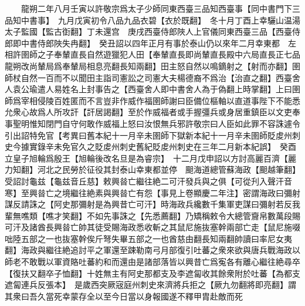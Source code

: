 　　龍朔二年八月壬寅以許敬宗爲太子少師同東西臺三品知西臺事【同中書門下三品知中書事】　九月戊寅初令八品九品衣碧【衣於既翻】　冬十月丁酉上幸驪山温湯太子監國【監古衘翻】丁未還宫　庚戌西臺侍郎陜人上官儀同東西臺三品【西臺侍郎即中書侍郎陜失冉翻】　癸丑詔以四年正月有事於泰山仍以來年二月幸東都　左相許圉師之子奉輦直長自然遊獵犯人田【奉輦直長即尚輦直長殿中六局直長正七品龍朔改尚輦局爲奉輦局相息亮翻長知兩翻】田主怒自然以鳴鏑射之【射而亦翻】圉師杖自然一百而不以聞田主詣司憲訟之司憲大夫楊德裔不爲治【治直之翻】西臺舍人袁公瑜遣人易姓名上封事告之【西臺舍人即中書舍人為于偽翻上時掌翻】上曰圉師爲宰相侵陵百姓匿而不言豈非作威作福圉師謝曰臣備位樞軸以直道事陛下不能悉允衆心故爲人所攻訐【訐居謁翻】至於作威福者或手握彊兵或身居重鎮臣以文吏奉事聖明惟知閉門自守何敢作威福上怒曰汝恨無兵邪許敬宗曰人臣如此罪不容誅遽令引出詔特免官【考異曰舊本紀十一月辛未圉師下獄新本紀十一月辛未圉師貶䖍州刺史今據實錄辛未免官久之貶䖍州刺史舊紀貶䖍州刺史在三年二月新本紀誤】　癸酉立皇子旭輪爲殷王【旭輪後改名旦是為睿宗】　十二月戊申詔以方討高麗百濟【麗力知翻】河北之民勞於征役其封泰山幸東都並停　䫻海道總管蘇海政【䫻越筆翻】受詔討龜兹【龜兹音丘慈】敕興㫺亡繼往絶二可汗發兵與之俱【可從刋入聲汗音寒】至興㫺亡之境繼往絶素與興㫺亡有怨【事見上卷顯慶二年注】密謂海政曰彌射謀反請誅之【阿史那彌射是為興昔亡可汗】時海政兵纔數千集軍吏謀曰彌射若反我輩無噍類【噍才笑翻】不如先事誅之【先悉薦翻】乃矯稱敕令大總管齎帛數萬段賜可汗及諸酋長興㫺亡帥其徒受賜海政悉收斬之其鼠尼施抜塞幹兩部亡走【鼠尼施啜咄陸五部之一也抜塞幹俟斤弩失畢五部之一也酋慈由翻長知兩翻帥讀曰率尼女夷翻】海政與繼往絶追討平之軍還至踈勒南弓月部復引吐蕃之衆來欲與唐兵戰海政以師老不敢戰以軍資賂吐蕃約和而還由是諸部落皆以興昔亡爲寃各有離心繼往絶尋卒【復扶又翻卒子恤翻】十姓無主有阿史那都支及李遮匐收其餘衆附於吐蕃【為都支遮匐連兵反張本】　是歲西突厥宼庭州刺史來濟將兵拒之【厥九勿翻將即亮翻】謂其衆曰吾久當死幸蒙存全以至今日當以身報國遂不釋甲胄赴敵而死

